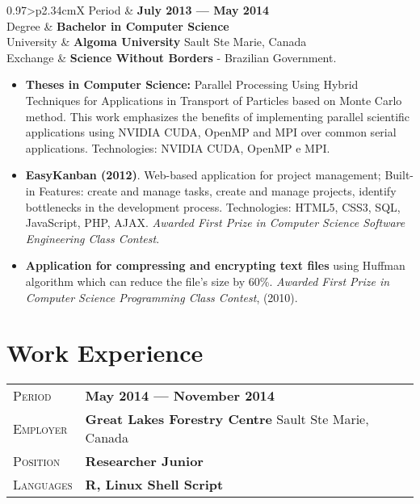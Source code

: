\documentclass[a4paper, oneside, final]{scrartcl} %
\newcommand{\gray}{\rowcolor[gray]{.90}} %
\begin{document}
\begin{center}
\begin{tabularx}{0.97\linewidth}{>{\raggedleft\scshape}p{2.34cm}X}
	\gray Period & \textbf{July 2013 --- May 2014}\\
	\gray Degree & \textbf{Bachelor in Computer Science}\\
	\gray University & \textbf{Algoma University} \hfill Sault Ste Marie, Canada\\
	Exchange & \textbf{Science Without Borders} - Brazilian Government.
\end{tabularx}

\begin{itemize}

\item \textbf{Theses in Computer Science:} Parallel Processing Using Hybrid Techniques for Applications in Transport of Particles based on Monte Carlo method. This work emphasizes the benefits of implementing parallel scientific applications using NVIDIA CUDA, OpenMP and MPI over common serial applications. Technologies: NVIDIA CUDA, OpenMP e MPI.
   
\item \textbf{EasyKanban (2012)}. Web-based application for project management; Built-in Features: create and manage tasks, create and manage projects, identify bottlenecks in the development process. Technologies: HTML5, CSS3, SQL, JavaScript, PHP, AJAX. \textit{Awarded First Prize in Computer Science Software Engineering Class Contest}.
  
\item \textbf{Application for compressing and encrypting text files} using Huffman algorithm which can reduce the file's size by 60\%. \textit{Awarded First Prize in Computer Science Programming Class Contest}, (2010). 
  
\end{itemize}




\section{Work Experience}

\begin{tabularx}{0.97\linewidth}{>{\raggedleft\scshape}p{2.2cm}X}
\gray Period & \textbf{May 2014 --- November 2014}\\
\gray Employer & \textbf{Great Lakes Forestry Centre } \hfill Sault Ste Marie, Canada\\
\gray Position & \textbf{Researcher Junior}\\
\gray Languages & \textbf{R, Linux Shell Script}\\


\end{tabularx}
\end{center}
\end{document}
